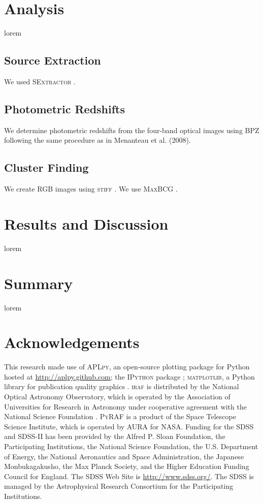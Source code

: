 \documentclass[fleqn,usenatbib]{mnras}
\begin{document}
\section{Analysis}\label{sec:analysis}
lorem

\subsection{Source Extraction}
We used \textsc{SExtractor} \citep{Bertin1996}.

\subsection{Photometric Redshifts}
We determine photometric redshifts from the four-band optical images using BPZ \citep{Benitez2000} following the same
procedure as in Menanteau et al. (2008).

\subsection{Cluster Finding}
We create RGB images using \textsc{stiff} \citep{Bertin2011}.
We use \textsc{MaxBCG} \citep{Koester2007b}.

\section{Results and Discussion}\label{sec:results}

lorem

\section{Summary}\label{sec:summary}

lorem

\section*{Acknowledgements} This research made use of \textsc{APLpy}, an open-source plotting package for Python hosted at \url{http://aplpy.github.com}; the \textsc{IPython} package \citep{Perez2007}; \textsc{matplotlib}, a Python library for publication quality graphics \citep{Hunter2007}. \textsc{iraf} is distributed by the National Optical Astronomy Observatory, which is operated by the Association of Universities for Research in Astronomy under cooperative agreement with the National Science Foundation \citep{Tody1993}. \textsc{PyRAF} is a product of the Space Telescope Science Institute, which is operated by AURA for NASA. Funding for the SDSS and SDSS-II has been provided by the Alfred P. Sloan Foundation, the Participating Institutions, the National Science Foundation, the U.S. Department of Energy, the National Aeronautics and Space Administration, the Japanese Monbukagakusho, the Max Planck Society, and the Higher Education Funding Council for England. The SDSS Web Site is \url{http://www.sdss.org/}. The SDSS is managed by the Astrophysical Research Consortium for the Participating Institutions.
\end{document}
